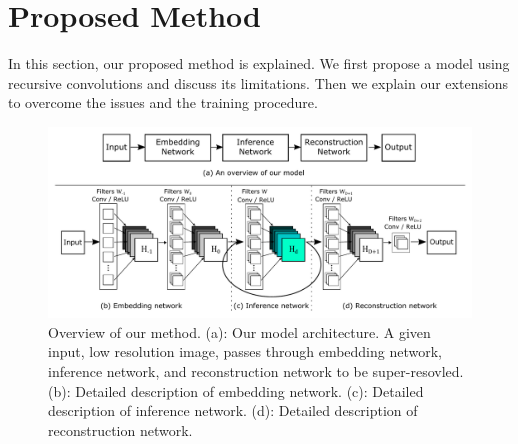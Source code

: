 \documentclass[10pt,twocolumn,letterpaper]{article}
\begin{document}
%
%
%
%
\section{Proposed Method}
In this section, our proposed method is explained. We first propose a model using recursive convolutions and discuss its limitations. Then we explain our extensions to overcome the issues and the training procedure.

\begin{figure}[t]
	\includegraphics[width=\textwidth]{figs/f1}
	\caption {Overview of our method. (a): Our model architecture. A given input, low resolution image, passes through embedding network, inference network, and reconstruction network to be super-resovled. (b): Detailed description of embedding network. (c): Detailed description of inference network. (d): Detailed description of reconstruction network.}
	\label{fig:overview}
\end{figure}
\end{document}
